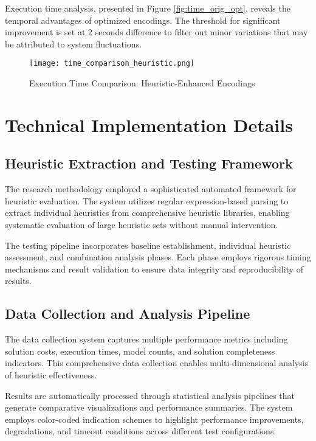 \documentclass[11pt,a4paper]{article}
\begin{document}
Execution time analysis, presented in Figure \ref{fig:time_orig_opt}, reveals the temporal advantages of optimized encodings. The threshold for significant improvement is set at 2 seconds difference to filter out minor variations that may be attributed to system fluctuations.

\begin{figure}[H]
    \centering
    \texttt{[image: time\_comparison\_heuristic.png]}
    \caption{Execution Time Comparison: Heuristic-Enhanced Encodings}
    \label{fig:time_heuristic}
\end{figure}

\section{Technical Implementation Details}

\subsection{Heuristic Extraction and Testing Framework}

The research methodology employed a sophisticated automated framework for heuristic evaluation. The system utilizes regular expression-based parsing to extract individual heuristics from comprehensive heuristic libraries, enabling systematic evaluation of large heuristic sets without manual intervention.

The testing pipeline incorporates baseline establishment, individual heuristic assessment, and combination analysis phases. Each phase employs rigorous timing mechanisms and result validation to ensure data integrity and reproducibility of results.

\subsection{Data Collection and Analysis Pipeline}

The data collection system captures multiple performance metrics including solution costs, execution times, model counts, and solution completeness indicators. This comprehensive data collection enables multi-dimensional analysis of heuristic effectiveness.

Results are automatically processed through statistical analysis pipelines that generate comparative visualizations and performance summaries. The system employs color-coded indication schemes to highlight performance improvements, degradations, and timeout conditions across different test configurations.
\end{document}
